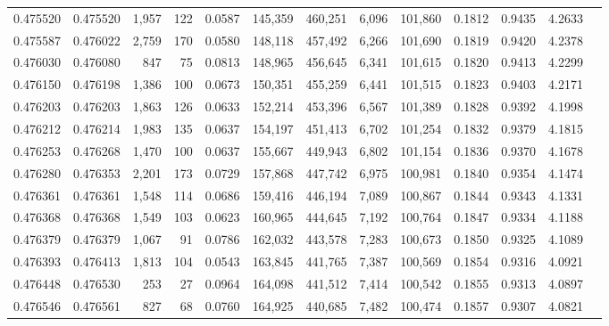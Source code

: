 \begin{tabular}{rrrrrrrrrrrrr}
0.475520 & 0.475520 & 1,957 &   122 &                                     0.0587 & 145,359 & 460,251 &   6,096 & 101,860 & 0.1812 & 0.9435 & 4.2633 \\
0.475587 & 0.476022 & 2,759 &   170 &                                     0.0580 & 148,118 & 457,492 &   6,266 & 101,690 & 0.1819 & 0.9420 & 4.2378 \\
0.476030 & 0.476080 &   847 &    75 &                                     0.0813 & 148,965 & 456,645 &   6,341 & 101,615 & 0.1820 & 0.9413 & 4.2299 \\
0.476150 & 0.476198 & 1,386 &   100 &                                     0.0673 & 150,351 & 455,259 &   6,441 & 101,515 & 0.1823 & 0.9403 & 4.2171 \\
0.476203 & 0.476203 & 1,863 &   126 &                                     0.0633 & 152,214 & 453,396 &   6,567 & 101,389 & 0.1828 & 0.9392 & 4.1998 \\
0.476212 & 0.476214 & 1,983 &   135 &                                     0.0637 & 154,197 & 451,413 &   6,702 & 101,254 & 0.1832 & 0.9379 & 4.1815 \\
0.476253 & 0.476268 & 1,470 &   100 &                                     0.0637 & 155,667 & 449,943 &   6,802 & 101,154 & 0.1836 & 0.9370 & 4.1678 \\
0.476280 & 0.476353 & 2,201 &   173 &                                     0.0729 & 157,868 & 447,742 &   6,975 & 100,981 & 0.1840 & 0.9354 & 4.1474 \\
0.476361 & 0.476361 & 1,548 &   114 &                                     0.0686 & 159,416 & 446,194 &   7,089 & 100,867 & 0.1844 & 0.9343 & 4.1331 \\
0.476368 & 0.476368 & 1,549 &   103 &                                     0.0623 & 160,965 & 444,645 &   7,192 & 100,764 & 0.1847 & 0.9334 & 4.1188 \\
0.476379 & 0.476379 & 1,067 &    91 &                                     0.0786 & 162,032 & 443,578 &   7,283 & 100,673 & 0.1850 & 0.9325 & 4.1089 \\
0.476393 & 0.476413 & 1,813 &   104 &                                     0.0543 & 163,845 & 441,765 &   7,387 & 100,569 & 0.1854 & 0.9316 & 4.0921 \\
0.476448 & 0.476530 &   253 &    27 &                                     0.0964 & 164,098 & 441,512 &   7,414 & 100,542 & 0.1855 & 0.9313 & 4.0897 \\
0.476546 & 0.476561 &   827 &    68 &                                     0.0760 & 164,925 & 440,685 &   7,482 & 100,474 & 0.1857 & 0.9307 & 4.0821 \\

\end{tabular}
